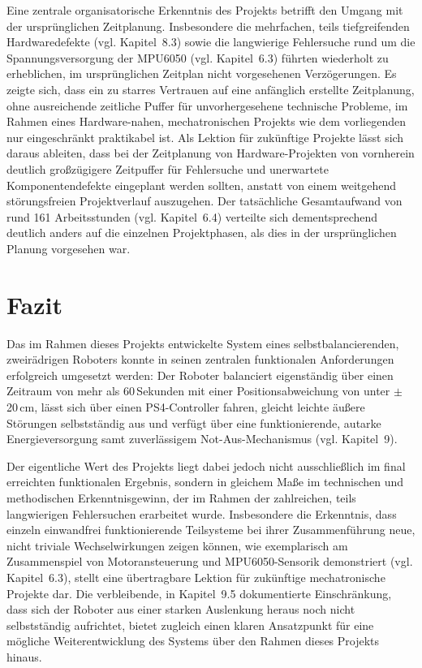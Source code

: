 \documentclass[12pt,ngerman,numbers=noenddot,abstracton,headsepline]{scrreprt}
\begin{document}
Eine zentrale organisatorische Erkenntnis des Projekts betrifft den Umgang mit der ursprünglichen Zeitplanung. Insbesondere die mehrfachen, teils tiefgreifenden Hardwaredefekte (vgl. Kapitel~8.3) sowie die langwierige Fehlersuche rund um die Spannungsversorgung der MPU6050 (vgl. Kapitel~6.3) führten wiederholt zu erheblichen, im ursprünglichen Zeitplan nicht vorgesehenen Verzögerungen. Es zeigte sich, dass ein zu starres Vertrauen auf eine anfänglich erstellte Zeitplanung, ohne ausreichende zeitliche Puffer für unvorhergesehene technische Probleme, im Rahmen eines Hardware-nahen, mechatronischen Projekts wie dem vorliegenden nur eingeschränkt praktikabel ist. Als Lektion für zukünftige Projekte lässt sich daraus ableiten, dass bei der Zeitplanung von Hardware-Projekten von vornherein deutlich großzügigere Zeitpuffer für Fehlersuche und unerwartete Komponentendefekte eingeplant werden sollten, anstatt von einem weitgehend störungsfreien Projektverlauf auszugehen. Der tatsächliche Gesamtaufwand von rund 161 Arbeitsstunden (vgl. Kapitel~6.4) verteilte sich dementsprechend deutlich anders auf die einzelnen Projektphasen, als dies in der ursprünglichen Planung vorgesehen war.

\section{Fazit}
\label{sec:fazit}

Das im Rahmen dieses Projekts entwickelte System eines selbstbalancierenden, zweirädrigen Roboters konnte in seinen zentralen funktionalen Anforderungen erfolgreich umgesetzt werden: Der Roboter balanciert eigenständig über einen Zeitraum von mehr als 60\,Sekunden mit einer Positionsabweichung von unter $\pm$20\,cm, lässt sich über einen PS4-Controller fahren, gleicht leichte äußere Störungen selbstständig aus und verfügt über eine funktionierende, autarke Energieversorgung samt zuverlässigem Not-Aus-Mechanismus (vgl. Kapitel~9).

Der eigentliche Wert des Projekts liegt dabei jedoch nicht ausschließlich im final erreichten funktionalen Ergebnis, sondern in gleichem Maße im technischen und methodischen Erkenntnisgewinn, der im Rahmen der zahlreichen, teils langwierigen Fehlersuchen erarbeitet wurde. Insbesondere die Erkenntnis, dass einzeln einwandfrei funktionierende Teilsysteme bei ihrer Zusammenführung neue, nicht triviale Wechselwirkungen zeigen können, wie exemplarisch am Zusammenspiel von Motoransteuerung und MPU6050-Sensorik demonstriert (vgl. Kapitel~6.3), stellt eine übertragbare Lektion für zukünftige mechatronische Projekte dar. Die verbleibende, in Kapitel~9.5 dokumentierte Einschränkung, dass sich der Roboter aus einer starken Auslenkung heraus noch nicht selbstständig aufrichtet, bietet zugleich einen klaren Ansatzpunkt für eine mögliche Weiterentwicklung des Systems über den Rahmen dieses Projekts hinaus.
\end{document}
